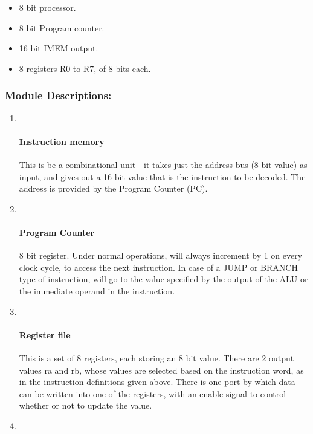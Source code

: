 \documentclass[11pt]{article}
\providecommand{\tightlist}{%
      \setlength{\itemsep}{0pt}\setlength{\parskip}{0pt}}
\begin{document}
\begin{itemize}
\tightlist
\item
  8 bit processor.
\item
  8 bit Program counter.
\item
  16 bit IMEM output.
\item
  8 registers R0 to R7, of 8 bits each. \_\_\_\_\_\_\_\_\_
\end{itemize}

\subsubsection{Module Descriptions:}\label{module-descriptions}

\begin{enumerate}
\def\labelenumi{\arabic{enumi}.}
\item ~
  \paragraph{Instruction memory}\label{instruction-memory}

  This is be a combinational unit - it takes just the address bus (8 bit
  value) as input, and gives out a 16-bit value that is the instruction
  to be decoded. The address is provided by the Program Counter (PC).
\item ~
  \paragraph{Program Counter}\label{program-counter}

  8 bit register. Under normal operations, will always increment by 1 on
  every clock cycle, to access the next instruction. In case of a JUMP
  or BRANCH type of instruction, will go to the value specified by the
  output of the ALU or the immediate operand in the instruction.
\item ~
  \paragraph{Register file}\label{register-file}

  This is a set of 8 registers, each storing an 8 bit value. There are 2
  output values ra and rb, whose values are selected based on the
  instruction word, as in the instruction definitions given above. There
  is one port by which data can be written into one of the registers,
  with an enable signal to control whether or not to update the value.
\item ~

\end{enumerate}
\end{document}
